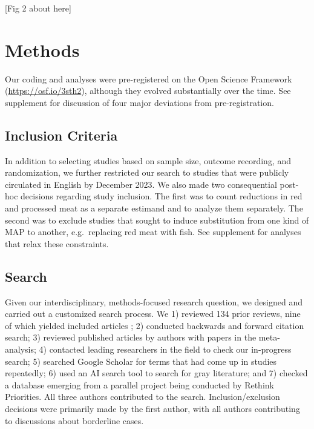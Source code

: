 \documentclass[sn-nature,referee,pdflatex]{sn-jnl}
\begin{document}
\begin{center}
[Fig 2 about here]
\end{center}
\begin{comment}
should this be a supplementary fig?
\end{comment}

\section{Methods}\label{sec3}

Our coding and analyses were pre-registered on the Open Science
Framework (\url{https://osf.io/3sth2}), although they evolved
substantially over the time. See supplement for discussion of four major
deviations from pre-registration.

\subsection{Inclusion Criteria}\label{sec3.1}

In addition to selecting studies based on sample size, outcome
recording, and randomization, we further restricted our search to
studies that were publicly circulated in English by December 2023. We
also made two consequential post-hoc decisions regarding study
inclusion. The first was to count reductions in red and processed meat
as a separate estimand and to analyze them separately. The second was to
exclude studies that sought to induce substitution from one kind of MAP
to another, e.g.~replacing red meat with fish. See supplement for
analyses that relax these constraints.

\subsection{Search}\label{sec3.2}

Given our interdisciplinary, methods-focused research question, we
designed and carried out a customized search process. We 1) reviewed 134
prior reviews, nine of which yielded included articles
\citep{mathur2021meta, bianchi2018conscious, bianchi2018restructuring, ammann2023, chang2023, DiGennaro2024, harguess2020, ronto2022, wynes2018};
2) conducted backwards and forward citation search; 3) reviewed
published articles by authors with papers in the meta-analysis; 4)
contacted leading researchers in the field to check our in-progress
search; 5) searched Google Scholar for terms that had come up in studies
repeatedly; 6) used an AI search tool to search for gray literature; and
7) checked a database emerging from a parallel project being conducted
by Rethink Priorities. All three authors contributed to the search.
Inclusion/exclusion decisions were primarily made by the first author,
with all authors contributing to discussions about borderline cases.
\end{document}
